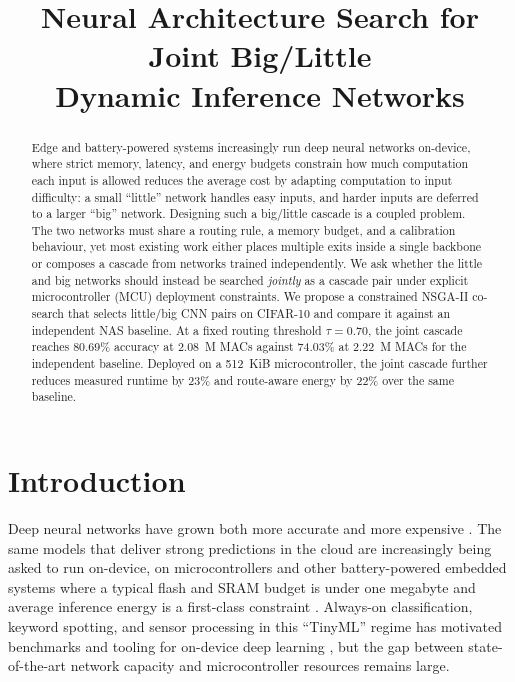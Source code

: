 \documentclass[conference]{IEEEtran}
\begin{document}
\title{Neural Architecture Search for Joint Big/Little\\Dynamic Inference Networks}

\author{
}

\maketitle
\thispagestyle{plain}
\pagestyle{plain}

\begin{abstract}
Edge and battery-powered systems increasingly run deep neural networks
on-device, where strict memory, latency, and energy budgets constrain how
much computation each input is allowed
reduces the average cost by adapting computation to input difficulty: a
small ``little'' network handles easy inputs, and harder inputs are
deferred to a larger ``big'' network. Designing such a big/little
cascade is a coupled problem. The two networks must share a routing rule,
a memory budget, and a calibration behaviour, yet most existing work
either places multiple exits inside a single backbone or composes a
cascade from networks trained independently. We ask whether the little
and big networks should instead be searched \emph{jointly} as a cascade
pair under explicit microcontroller (MCU) deployment constraints. We
propose a constrained NSGA-II co-search that selects
little/big CNN pairs on CIFAR-10 and compare it against an independent
NAS baseline. At a fixed routing threshold $\tau=0.70$, the joint cascade
reaches 80.69\% accuracy at 2.08~M MACs against 74.03\% at 2.22~M MACs
for the independent baseline. Deployed on a 512~KiB microcontroller, the
joint cascade further reduces measured runtime by 23\% and route-aware
energy by 22\% over the same baseline.
\end{abstract}

\section{Introduction}
\label{sec:introduction}

Deep neural networks have grown both more accurate and more expensive
\cite{he2016resnet,tan2019efficientnet}. The same models that deliver strong
predictions in the cloud are increasingly being asked to run on-device, on
microcontrollers and other battery-powered embedded systems where a typical
flash and SRAM budget is under one megabyte and average inference energy is a
first-class constraint \cite{warden2019tinyml,david2021tflm,lin2020mcunet}.
Always-on classification, keyword spotting, and sensor processing in this
``TinyML'' regime has motivated benchmarks and tooling for on-device deep
learning \cite{banbury2021mlperftiny}, but the gap between
state-of-the-art network capacity and microcontroller resources remains large.
\end{document}
